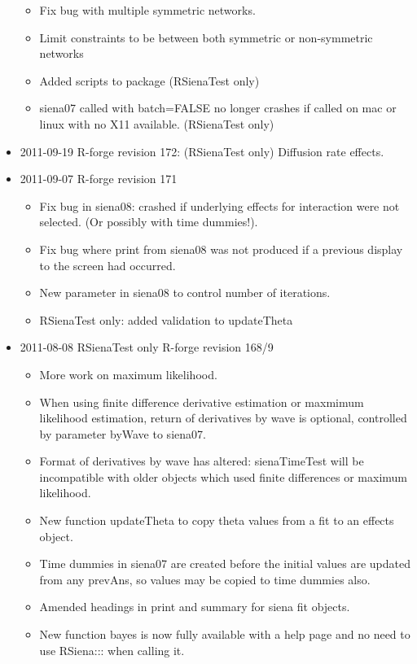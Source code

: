 \documentclass[a4paper,fleqn,11pt]{article}
\newcommand{\+}{\, + \,}
\newcommand{\sfn}[1]{\textsf{#1}}
\begin{document}
\begin{small}
\begin{itemize}
\begin{itemize}
\item Fix bug with multiple symmetric networks.
\item Limit constraints to be between both symmetric or non-symmetric networks
\item Added scripts to package (RSienaTest only)
\item siena07 called with batch=FALSE no longer crashes if called on mac or
linux with no X11 available. (RSienaTest only)
\end{itemize}
\item 2011-09-19 R-forge revision 172: (RSienaTest only) Diffusion rate effects.
\item 2011-09-07 R-forge revision 171
\begin{itemize}
\item Fix bug in siena08: crashed if underlying effects for interaction were not
  selected. (Or possibly with time dummies!).
\item Fix bug where print from siena08 was not produced if a previous display to
  the screen had occurred.
\item New parameter in siena08 to control number of iterations.
\item RSienaTest only: added validation to updateTheta
\end{itemize}
\item 2011-08-08 RSienaTest only R-forge revision 168/9
\begin{itemize}
\item More work on maximum likelihood.
\item When using finite difference derivative estimation or maxmimum likelihood
  estimation, return of derivatives by wave is optional, controlled by parameter
  byWave to siena07.
\item Format of derivatives by wave has altered: sienaTimeTest will be
  incompatible with older objects which used finite differences or maximum
  likelihood.
\item New function \sfn{updateTheta} to copy theta values from a fit to an
  effects object.
\item Time dummies in siena07 are created before the initial values are updated
  from any prevAns, so values may be copied to time dummies also.
\item Amended headings in print and summary for siena fit objects.
\item New function \sfn{bayes} is now fully available with a help page and no
  need to use RSiena::: when calling it.

\end{itemize}
\end{itemize}
\end{small}
\end{document}
